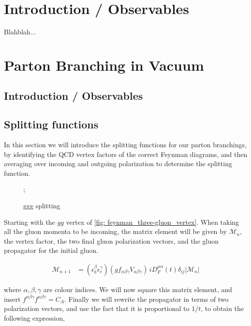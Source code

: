 \documentclass[main.tex]{subfiles}
\begin{document}
\section{Introduction / Observables }
Blahblah...



\section{Parton Branching in Vacuum}

\subsection{Introduction / Observables}

\subsection{Splitting functions}\label{sec: derivation_splitting_functions_vacuum}
In this section we will introduce the splitting functions for our parton branchings, by identifying the QCD vertex factors of the correct Feynman diagrams, and then averaging over incoming and outgoing polarization to determine the splitting function. 

\begin{figure}[H]
    \centering
    ;
    \caption{ggg splitting}
    \label{fig: test3}
\end{figure}

Starting with the \(gg\) vertex of \autoref{fig: feynman_three-gluon_vertex}. When taking all the gluon momenta to be incoming, the matrix element will be given by \(\mathcal{M}_n\), the vertex factor, the two final gluon polarization vectors, and the gluon propagator for the initial gluon. 

\begin{align}
    \mathcal{M}_{n+1} &=  \left( \epsilon_b^\beta \epsilon_c^\gamma  \right) \left(gf_{\alpha\beta\gamma} V_{\alpha\beta\gamma}\right)  \, i D_F^{\mu\alpha}(t)\delta_{ij}  |\mathcal{M}_n|
\end{align}

where \(\alpha,\beta,\gamma\) are colour indices. We will now square this matrix element, and insert \(f^{\alpha\beta\gamma}f^{\alpha\beta\gamma}=C_A\). Finally we will rewrite the propagator in terms of two polarization vectors, and use the fact that it is proportional to \(1/t\), to obtain the following expression,
\end{document}
